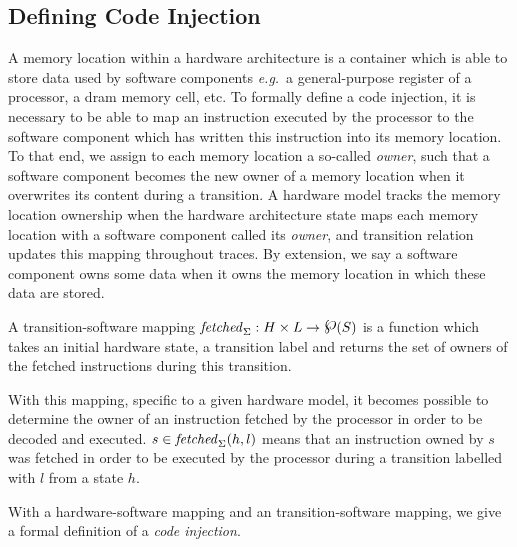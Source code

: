 \subsection{Defining Code Injection}
\label{subsec:speccert:tampering}

A memory location within a hardware architecture is a container which is able to
store data used by software components \emph{e.g.}~a general-purpose register of
a processor, a \ac{dram} memory cell, etc.
%
To formally define a code injection, it is necessary to be able to map an
instruction executed by the processor to the software component which has
written this instruction into its memory location.
%
To that end, we assign to each memory location a so-called \emph{owner}, such
that a software component becomes the new owner of a memory location when it
overwrites its content during a transition.
%
A hardware model tracks the memory location ownership when the hardware
architecture state maps each memory location with a software component called
its \emph{owner}, and transition relation updates this mapping throughout
traces.
%
By extension, we say a software component owns some data when it owns the memory
location in which these data are stored.

\begin{definition}
  \label{def:speccert:transsoft}
  A transition-software mapping
  $\func{fetched}_{\Sigma}: H \times L \rightarrow \powerset(S)$ is a function
  which takes an initial hardware state, a transition label and returns the set
  of owners of the fetched instructions during this transition.
\end{definition}

With this mapping, specific to a given hardware model, it becomes possible to
determine the owner of an instruction fetched by the processor in order to be
decoded and executed.
%
\( s \in \mathit{fetched}_{\Sigma}(h, l) \) means that an instruction owned by $s$
was fetched in order to be executed by the processor during a transition
labelled with \( l \) from a state \( h \).

With a hardware-software mapping and an transition-software mapping, we give a
formal definition of a \textit{code injection}.

%

